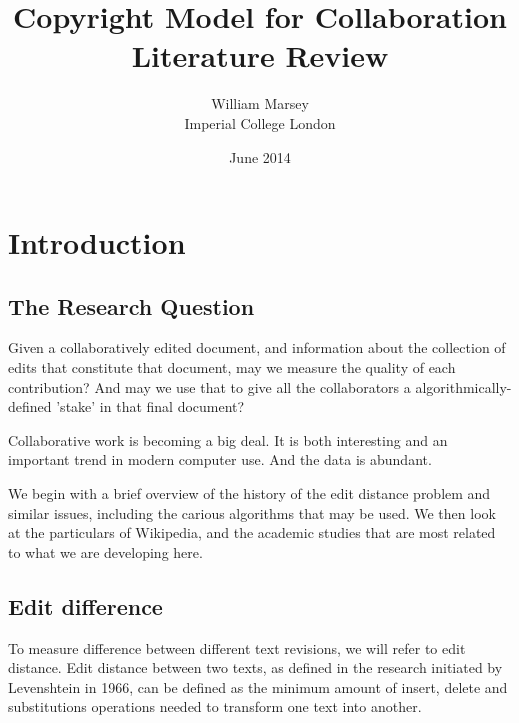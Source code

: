 \documentclass[a4paper,11pt,twoside,notitlepage]{article}
\begin{document}
	\title{Copyright Model for Collaboration
		\\ \small Literature Review}
	\author{William Marsey
		\\Imperial College London}
	\date{June 2014}
 	\maketitle	
        

        \section{Introduction}
        \subsection{The Research Question}
        Given a collaboratively edited document, and information about
        the collection of edits that constitute that document, may we
        measure the quality of each contribution? And may we use that
        to give all the collaborators a algorithmically-defined 'stake'
        in that final document?
        
        Collaborative work is becoming a big deal. It is both
        interesting and an important trend in modern computer
        use. And the data is abundant. 
        
        We begin with a brief overview of the history of
        the edit distance problem and similar issues, including the
        carious algorithms that may be used. We then look at the
        particulars of Wikipedia, and the academic studies that are
        most related to what we are developing here.


        \subsection{Edit difference}
        To measure difference between different text revisions, we
        will refer to edit distance. Edit distance between two texts,
        as defined in the research initiated by Levenshtein in
        1966,\cite{Levenshtein1966} can be defined as the minimum
        amount of insert, delete and substitutions operations needed
        to transform one text into another.
\end{document}
